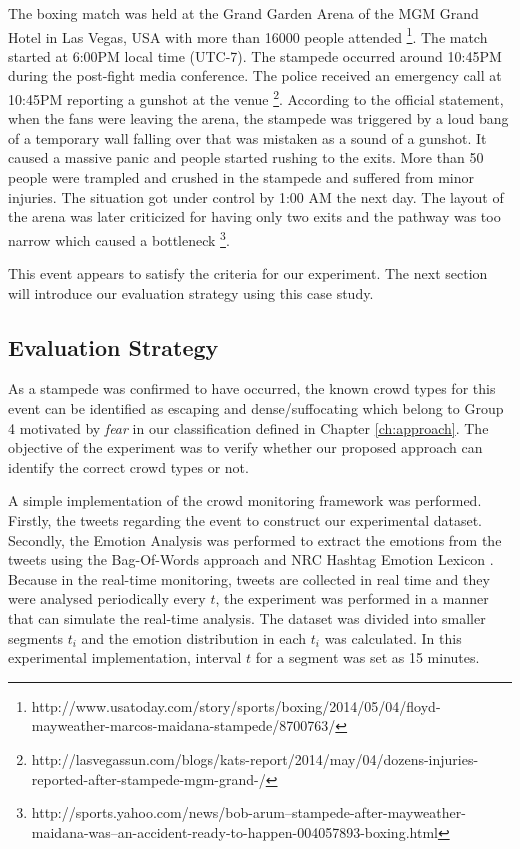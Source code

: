 The boxing match was held at the Grand Garden Arena of the MGM Grand Hotel in Las Vegas, USA with more than 16000 people attended \footnote{http://www.usatoday.com/story/sports/boxing/2014/05/04/floyd-mayweather-marcos-maidana-stampede/8700763/}. The match started at 6:00PM local time (UTC-7). The stampede occurred around 10:45PM during the post-fight media conference. The police received an emergency call at 10:45PM reporting a gunshot at the venue \footnote{http://lasvegassun.com/blogs/kats-report/2014/may/04/dozens-injuries-reported-after-stampede-mgm-grand-/}. According to the official statement, when the fans were leaving the arena, the stampede was triggered by a loud bang of a temporary wall falling over that was mistaken as a sound of a gunshot. It caused a massive panic and people started rushing to the exits. More than 50 people were trampled and crushed in the stampede and suffered from minor injuries. The situation got under control by 1:00 AM the next day. The layout of the arena was later criticized for having only two exits and the pathway was too narrow which caused a bottleneck \footnote{http://sports.yahoo.com/news/bob-arum--stampede-after-mayweather-maidana-was--an-accident-ready-to-happen-004057893-boxing.html}.

This event appears to satisfy the criteria for our experiment. The next section will introduce our evaluation strategy using this case study.

\subsection{Evaluation Strategy}

As a stampede was confirmed to have occurred, the known crowd types for this event can be identified as escaping and dense/suffocating which belong to Group 4 motivated by \textit{fear} in our classification defined in Chapter \ref{ch:approach}. The objective of the experiment was to verify whether our proposed approach can identify the correct crowd types or not.

A simple implementation of the crowd monitoring framework was performed. Firstly, the tweets regarding the event to construct our experimental dataset. Secondly, the Emotion Analysis was performed to extract the emotions from the tweets using the Bag-Of-Words approach and NRC Hashtag Emotion Lexicon \citep{mohammad2014using}. Because in the real-time monitoring, tweets are collected in real time and they were analysed periodically every \(t\), the experiment was performed in a manner that can simulate the real-time analysis. The dataset was divided into smaller segments \(t_i\) and the emotion distribution in each \(t_i\) was calculated. In this experimental implementation, interval \(t\) for a segment was set as 15 minutes.

